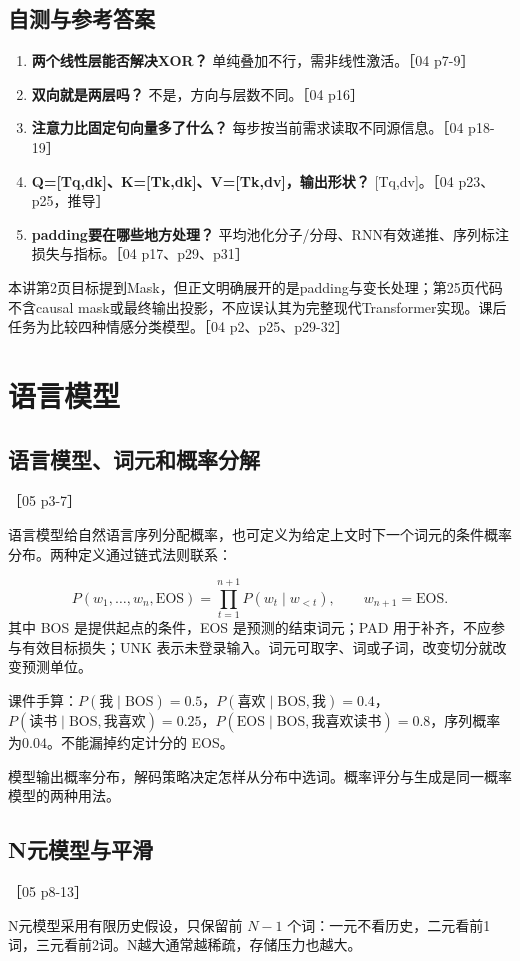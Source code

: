 \documentclass[UTF8,a4paper,zihao=-4,fontset=windows]{ctexart}
\newcommand{\source}[1]{{\small #1}\par}
\begin{document}
\subsection{自测与参考答案}
\begin{enumerate}
\item {}\textbf{两个线性层能否解决XOR？} 单纯叠加不行，需非线性激活。［04 p7-9］
\item {}\textbf{双向就是两层吗？} 不是，方向与层数不同。［04 p16］
\item {}\textbf{注意力比固定句向量多了什么？} 每步按当前需求读取不同源信息。［04 p18-19］
\item {}\textbf{Q=[Tq,dk]、K=[Tk,dk]、V=[Tk,dv]，输出形状？} [Tq,dv]。［04 p23、p25，推导］
\item {}\textbf{padding要在哪些地方处理？} 平均池化分子/\allowbreak{}分母、RNN有效递推、序列标注损失与指标。［04 p17、p29、p31］
\end{enumerate}
本讲第2页目标提到Mask，但正文明确展开的是padding与变长处理；第25页代码不含causal mask或最终输出投影，不应误认其为完整现代Transformer实现。课后任务为比较四种情感分类模型。［04 p2、p25、p29-32］

\section{语言模型}
\subsection{语言模型、词元和概率分解}
\source{［05 p3-7］}
语言模型给自然语言序列分配概率，也可定义为给定上文时下一个词元的条件概率分布。两种定义通过链式法则联系：

\[P(w_1,\ldots,w_n,\mathrm{EOS})=\prod_{t=1}^{n+1}P(w_t\mid w_{<t}),\qquad w_{n+1}=\mathrm{EOS}.\]
其中 BOS 是提供起点的条件，EOS 是预测的结束词元；PAD 用于补齐，不应参与有效目标损失；UNK 表示未登录输入。词元可取字、词或子词，改变切分就改变预测单位。

课件手算：$P(\text{我}\mid\mathrm{BOS})=0.5$，$P(\text{喜欢}\mid\mathrm{BOS},\text{我})=0.4$，$P(\text{读书}\mid\mathrm{BOS},\text{我喜欢})=0.25$，$P(\mathrm{EOS}\mid\mathrm{BOS},\text{我喜欢读书})=0.8$，序列概率为$0.04$。不能漏掉约定计分的 EOS。

模型输出概率分布，解码策略决定怎样从分布中选词。概率评分与生成是同一概率模型的两种用法。

\subsection{N元模型与平滑}
\source{［05 p8-13］}
N元模型采用有限历史假设，只保留前 $N-1$ 个词：一元不看历史，二元看前1词，三元看前2词。N越大通常越稀疏，存储压力也越大。
\end{document}
